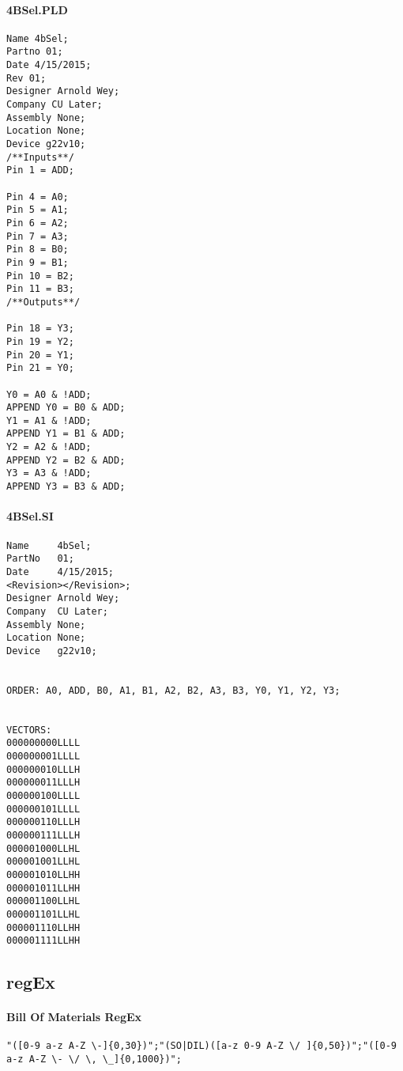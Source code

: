 \documentclass[letterpaper,titlepage,oneside]{article}
\begin{document}
\pagebreak
\paragraph*{4BSel.PLD}
\label{code: 4BSel}
\begin{lstlisting}
Name 4bSel;
Partno 01;
Date 4/15/2015;
Rev 01;
Designer Arnold Wey;
Company CU Later;
Assembly None;
Location None;
Device g22v10;
/**Inputs**/
Pin 1 = ADD;

Pin 4 = A0;
Pin 5 = A1;
Pin 6 = A2;
Pin 7 = A3;
Pin 8 = B0;
Pin 9 = B1;
Pin 10 = B2;
Pin 11 = B3;
/**Outputs**/

Pin 18 = Y3;
Pin 19 = Y2;
Pin 20 = Y1;
Pin 21 = Y0;

Y0 = A0 & !ADD;
APPEND Y0 = B0 & ADD;
Y1 = A1 & !ADD;
APPEND Y1 = B1 & ADD;
Y2 = A2 & !ADD;
APPEND Y2 = B2 & ADD;
Y3 = A3 & !ADD;
APPEND Y3 = B3 & ADD;

\end{lstlisting}
\pagebreak
\paragraph*{4BSel.SI}
\label{code: 4BSelSi}
\begin{lstlisting}
Name     4bSel;
PartNo   01;
Date     4/15/2015;
<Revision></Revision>;
Designer Arnold Wey;
Company  CU Later;
Assembly None;
Location None;
Device   g22v10;


ORDER: A0, ADD, B0, A1, B1, A2, B2, A3, B3, Y0, Y1, Y2, Y3; 


VECTORS:
000000000LLLL
000000001LLLL
000000010LLLH
000000011LLLH
000000100LLLL
000000101LLLL
000000110LLLH
000000111LLLH
000001000LLHL
000001001LLHL
000001010LLHH
000001011LLHH
000001100LLHL
000001101LLHL
000001110LLHH
000001111LLHH
\end{lstlisting}

\clearpage

\subsection{regEx}
\paragraph*{Bill Of Materials RegEx\\}
\label{code: RegexClean}
\begin{lstlisting}
"([0-9 a-z A-Z \-]{0,30})";"(SO|DIL)([a-z 0-9 A-Z \/ ]{0,50})";"([0-9 a-z A-Z \- \/ \, \_]{0,1000})";
\end{lstlisting}
\end{document}
